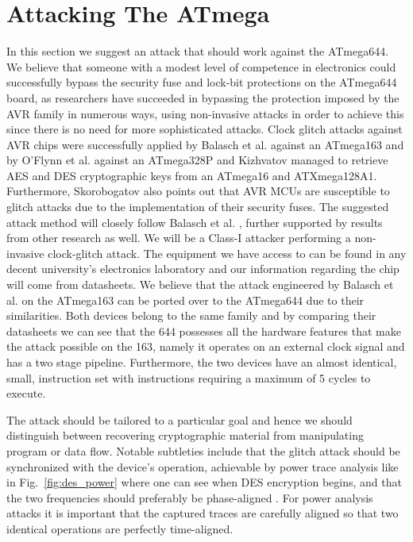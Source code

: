 \section{Attacking The ATmega}
\label{sec:attacking_mega}

In this section we suggest an attack that should work against the ATmega644. We believe that someone with a modest level of competence in electronics could successfully bypass the security fuse and lock-bit protections on the ATmega644 board, as researchers have succeeded in bypassing the protection imposed by the AVR family in numerous ways, using non-invasive attacks in order to achieve this since there is no need for more sophisticated attacks. Clock glitch attacks against AVR chips were successfully applied by Balasch et al. \citep{glitches_paper} against an ATmega163 and by O'Flynn et al. \citep{chipwhisperer} against an ATmega328P and Kizhvatov \citep{avr_mega} managed to retrieve AES and DES cryptographic keys from an ATmega16 and ATXmega128A1. Furthermore, Skorobogatov \citep{sergei:thesis} also points out that AVR MCUs are susceptible to glitch attacks due to the implementation of their security fuses. The suggested attack method will closely follow Balasch et al. \citep{glitches_paper}, further supported by results from other research as well. We will be a Class-I attacker performing a non-invasive clock-glitch attack. The equipment we have access to can be found in any decent university's electronics laboratory and our information regarding the chip will come from datasheets. We believe that the attack engineered by Balasch et al. \citep{glitches_paper} on the ATmega163 can be ported over to the ATmega644 due to their similarities. Both devices belong to the same family and by comparing their datasheets we can see that the 644 possesses all the hardware features that make the attack possible on the 163, namely it operates on an external clock signal and has a two stage pipeline\citep{glitches_paper}. Furthermore, the two devices have an almost identical, small, instruction set with instructions requiring a maximum of 5 cycles to execute.
 
The attack should be tailored to a particular goal and hence we should distinguish between recovering cryptographic material from manipulating program or data flow. Notable subtleties include that the glitch attack should be synchronized with the device’s operation, achievable by power trace analysis like in Fig.~\ref{fig:des_power} where one can see when DES encryption begins, and that the two frequencies should preferably be phase-aligned \citep{glitches_paper}\citep{sergei:thesis}\citep{avr_mega}. For power analysis attacks it is important that the captured traces are carefully aligned so that two identical operations are perfectly time-aligned.

